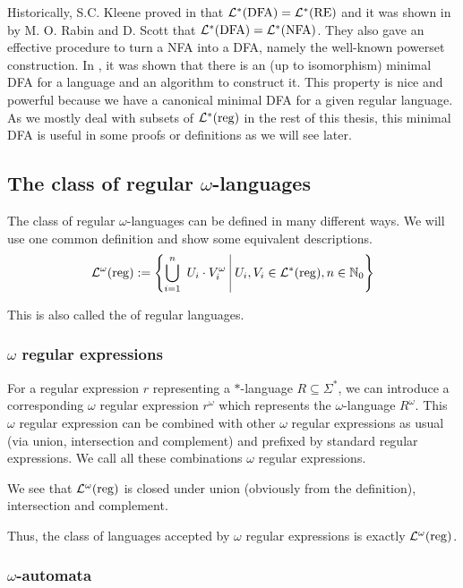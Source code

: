 Historically, S.C. Kleene proved in \cite{Kleene56} that $\mathcal{L}^*(\text{DFA}) = \mathcal{L}^*(\text{RE}) $ and it was shown in \cite{FinAutRabin59} by M. O. Rabin and D. Scott that $\mathcal{L}^*(\text{DFA}) = \mathcal{L}^*(\text{NFA})$. They also gave an effective procedure to turn a NFA into a DFA, namely the well-known powerset construction. In \cite{DFAMinMoore56}, it was shown that there is an (up to isomorphism) minimal DFA for a language and an algorithm to construct it. This property is nice and powerful because we have a canonical minimal DFA for a given regular language. As we mostly deal with subsets of $\mathcal{L}^*(\textup{\textrm{reg}})$ in the rest of this thesis, this minimal DFA is useful in some proofs or definitions as we will see later.



\subsection{The class of regular $\omega$-languages}
\label{reg-omega-lang}

The class of regular $\omega$-languages can be defined in many different ways. We will use one common definition and show some equivalent descriptions.
\[ \LangOreg := \Set{ \bigcup_{i=1}^n\ U_i \cdot V_i^\omega }{ U_i, V_i \in \Langreg, n \in \N_0 } \]

This is also called the  of regular languages.

\subsubsection{$\omega$ regular expressions}

For a regular expression $r$ representing a $*$-language $R\subseteq \Sigma^*$, we can introduce a corresponding $\omega$ regular expression $r^\omega$ which represents the $\omega$-language $R^\omega$. This $\omega$ regular expression can be combined with other $\omega$ regular expressions as usual (via union, intersection and complement) and prefixed by standard regular expressions. We call all these combinations $\omega$ regular expressions.

We see that $\mathcal{L}^\omega(\textup{\textrm{reg}})$ is closed under union (obviously from the definition), intersection and complement.

Thus, the class of languages accepted by $\omega$ regular expressions is exactly $\mathcal{L}^\omega(\textup{\textrm{reg}})$.


\subsubsection{$\omega$-automata}

